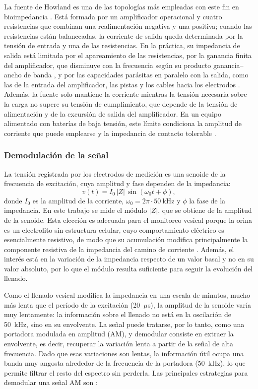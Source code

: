 \documentclass[12pt,a4paper]{article}
\begin{document}
La fuente de Howland es una de las topologías más empleadas con este fin en bioimpedancia
\cite{alrawi2013howland,nwokoye2024howland}. Está formada por un amplificador operacional y cuatro
resistencias que combinan una realimentación negativa y una positiva; cuando las resistencias están
balanceadas, la corriente de salida queda determinada por la tensión de entrada y una de las
resistencias. En la práctica, su impedancia de salida está limitada por el apareamiento de las
resistencias, por la ganancia finita del amplificador, que disminuye con la frecuencia según su
producto ganancia--ancho de banda \cite{ti_gbw_model}, y por las capacidades parásitas en paralelo
con la salida, como las de la entrada del amplificador, las pistas y los cables hacia los electrodos
\cite{nwokoye2024howland}. Además, la fuente solo mantiene la corriente mientras la tensión necesaria
sobre la carga no supere su tensión de cumplimiento, que depende de la tensión de alimentación y de la
excursión de salida del amplificador. En un equipo alimentado con baterías de baja tensión, este
límite condiciona la amplitud de corriente que puede emplearse y la impedancia de contacto tolerable
\cite{nwokoye2024howland}.

\subsubsection{Demodulación de la señal}

La tensión registrada por los electrodos de medición es una senoide de la frecuencia de excitación,
cuya amplitud y fase dependen de la impedancia:
\begin{equation}
    v(t)=I_0\,|Z|\,\sin(\omega_0 t+\phi),
    \label{eq:portadora}
\end{equation}
donde $I_0$ es la amplitud de la corriente, $\omega_0=2\pi\cdot50~\mathrm{kHz}$ y $\phi$ la fase de la
impedancia. En este trabajo se mide el módulo $|Z|$, que se obtiene de la amplitud de la senoide. Esta
elección es adecuada para el monitoreo vesical porque la orina es un electrolito sin estructura
celular, cuyo comportamiento eléctrico es esencialmente resistivo, de modo que su acumulación modifica
principalmente la componente resistiva de la impedancia del camino de corriente
\cite{grimnes2015bioimpedance}. Además, el interés está en la variación de la impedancia respecto de
un valor basal y no en su valor absoluto, por lo que el módulo resulta suficiente para seguir la
evolución del llenado.

Como el llenado vesical modifica la impedancia en una escala de minutos, mucho más lenta que el
período de la excitación (20~$\mu$s), la amplitud de la senoide varía muy lentamente: la información
sobre el llenado no está en la oscilación de 50~kHz, sino en su envolvente. La señal puede tratarse,
por lo tanto, como una portadora modulada en amplitud (AM), y demodular consiste en extraer la
envolvente, es decir, recuperar la variación lenta a partir de la señal de alta frecuencia. Dado que
esas variaciones son lentas, la información útil ocupa una banda muy angosta alrededor de la frecuencia
de la portadora (50~kHz), lo
que permite filtrar el resto del espectro sin perderla. Las principales estrategias para demodular una
señal AM son \cite{lathi2009communication}:
\end{document}

